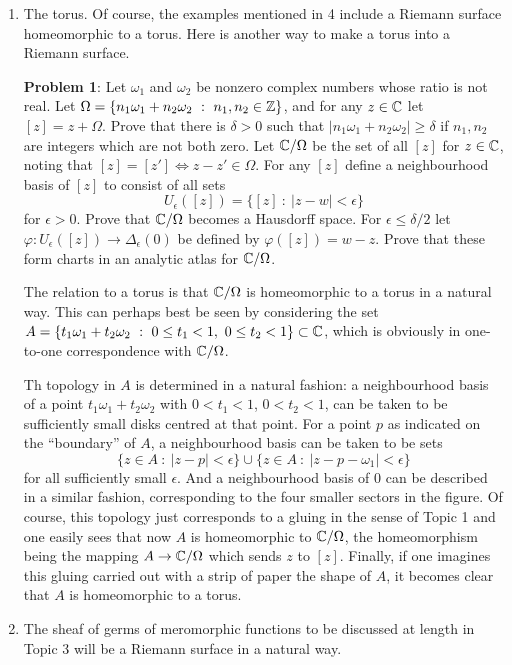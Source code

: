 \documentclass[a4paper,11pt]{article}
\begin{document}
\begin{exmp}
\begin{enumerate}
  \item The torus. Of course, the examples mentioned in 4 include a
    Riemann surface homeomorphic to a torus.  Here is another way to
    make a torus into a Riemann surface.

    \textbf{Problem 1}: Let $\omega_1$ and $\omega_2$ be nonzero
    complex numbers whose ratio is not real.  Let $\Omega = \{n_1
    \omega_1 + n_2 \omega_2 ~:~ n_1,n_2 \in {\mathbb Z}\}$, and for any $z \in
    {\mathbb C}$ let $[z] = z + \Omega$.  Prove that there is $\delta > 0$
    such that $|n_1 \omega_1 + n_2 \omega_2 | \ge \delta$ if $n_1,
    n_2$ are integers which are not both zero.  Let ${\mathbb C}/\Omega$ be
    the set of all $[z]$ for $z \in {\mathbb C}$, noting that $[z] = [z']
    \Leftrightarrow z - z' \in \Omega$.  For any $[z]$ define a
    neighbourhood basis of $[z]$ to consist of all sets
    $$
    U_\epsilon([z]) = \{[z] ~:~ |z-w| < \epsilon\}
    $$
    for $\epsilon > 0$.  Prove that ${\mathbb C}/\Omega$ becomes a
    Hausdorff space.  For $\epsilon \le \delta/2$ let $\varphi :
    U_\epsilon([z]) \to \Delta_\epsilon(0)$ be defined by
    $\varphi([z]) = w-z$.  Prove that these form charts in an
    analytic atlas for ${\mathbb C}/\Omega$.

    The relation to a torus is that ${\mathbb C}/\Omega$ is homeomorphic to a
    torus in a natural way.  This can perhaps best be seen by
    considering the set $A = \{t_1 \omega_1 + t_2 \omega_2 ~:~ 0 \le
    t_1 < 1,\ 0 \le t_2 < 1\} \subset {\mathbb C}$, which is obviously in
    one-to-one correspondence with ${\mathbb C}/\Omega$.

    Th topology in $A$ is determined in a natural fashion: a
    neighbourhood basis of a point $t_1 \omega_1 + t_2 \omega_2$ with
    $0 < t_1 < 1$, $0 < t_2 < 1$, can be taken to be sufficiently
    small disks centred at that point.  For a point $p$ as indicated
    on the ``boundary'' of $A$, a neighbourhood basis can be taken to
    be sets 
    $$
    \{z \in A ~:~ |z-p| < \epsilon\} \cup \{z\in A ~:~
    |z-p-\omega_1| < \epsilon\}
    $$
    for all sufficiently small $\epsilon$.  And a neighbourhood basis
    of 0 can be described in a similar fashion, corresponding to the
    four smaller sectors in the figure.  Of course, this topology just
    corresponds to a gluing in the sense of Topic 1 and one easily
    sees that now $A$ is homeomorphic to ${\mathbb C}/\Omega$, the
    homeomorphism being the mapping $A \to {\mathbb C}/\Omega$ which sends
    $z$ to $[z]$.  Finally, if one imagines this gluing carried out
    with a strip of paper the shape of $A$, it becomes clear that $A$
    is homeomorphic to a torus.

  \item The sheaf of germs of meromorphic functions to be discussed at
    length in Topic 3 will be a Riemann surface in a natural way.
  \end{enumerate}
\end{exmp}
\end{document}
